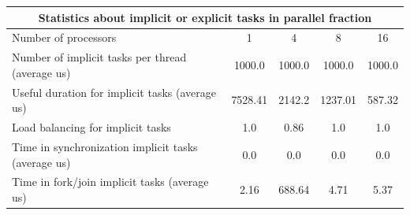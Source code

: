 \begin{tabular}{|l|c|c|c|c|}
\hline
\multicolumn{5}{|c|}{Statistics about implicit or explicit tasks in parallel fraction} \\
\hline
\hline
Number of processors & 1 & 4 & 8 & 16 \\
\hline
\hline
Number of implicit tasks per thread (average us)    &          1000.0 &          1000.0 &          1000.0 &          1000.0 \\
\hline
Useful duration for implicit tasks (average us)     &         7528.41 &          2142.2 &         1237.01 &          587.32 \\
\hline
Load balancing for implicit tasks                &             1.0 &            0.86 &             1.0 &             1.0 \\
\hline
Time in synchronization implicit tasks (average us) &             0.0 &             0.0 &             0.0 &             0.0 \\
\hline
Time in fork/join implicit tasks (average us)       &            2.16 &          688.64 &            4.71 &            5.37 \\
\hline
\end{tabular}
